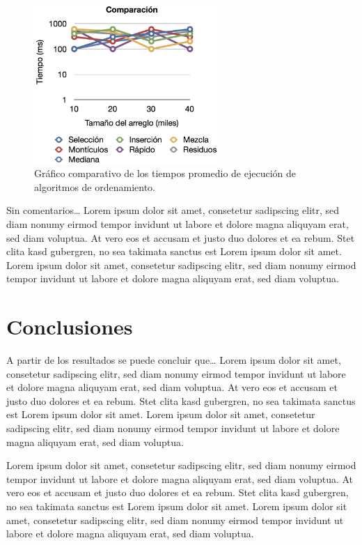 \documentclass[twocolumn,english,spanish,journal]{IEEEtran}
\begin{document}
\begin{figure}
\begin{centering}
\includegraphics[width=0.62\textwidth]{log}
\par\end{centering}

\caption{Gráfico comparativo de los tiempos promedio de ejecución de algoritmos de ordenamiento.\label{fig:log}}
\end{figure}

Sin comentarios\ldots{} Lorem ipsum dolor sit amet, consetetur sadipscing
elitr, sed diam nonumy eirmod tempor invidunt ut labore et dolore
magna aliquyam erat, sed diam voluptua. At vero eos et accusam et
justo duo dolores et ea rebum. Stet clita kasd gubergren, no sea takimata
sanctus est Lorem ipsum dolor sit amet. Lorem ipsum dolor sit amet,
consetetur sadipscing elitr, sed diam nonumy eirmod tempor invidunt
ut labore et dolore magna aliquyam erat, sed diam voluptua.


\section{Conclusiones}

A partir de los resultados se puede concluir que\ldots{} Lorem ipsum
dolor sit amet, consetetur sadipscing elitr, sed diam nonumy eirmod
tempor invidunt ut labore et dolore magna aliquyam erat, sed diam
voluptua. At vero eos et accusam et justo duo dolores et ea rebum.
Stet clita kasd gubergren, no sea takimata sanctus est Lorem ipsum
dolor sit amet. Lorem ipsum dolor sit amet, consetetur sadipscing
elitr, sed diam nonumy eirmod tempor invidunt ut labore et dolore
magna aliquyam erat, sed diam voluptua.

Lorem ipsum dolor sit amet, consetetur sadipscing elitr, sed diam
nonumy eirmod tempor invidunt ut labore et dolore magna aliquyam erat,
sed diam voluptua. At vero eos et accusam et justo duo dolores et
ea rebum. Stet clita kasd gubergren, no sea takimata sanctus est Lorem
ipsum dolor sit amet. Lorem ipsum dolor sit amet, consetetur sadipscing
elitr, sed diam nonumy eirmod tempor invidunt ut labore et dolore
magna aliquyam erat, sed diam voluptua.
\end{document}
